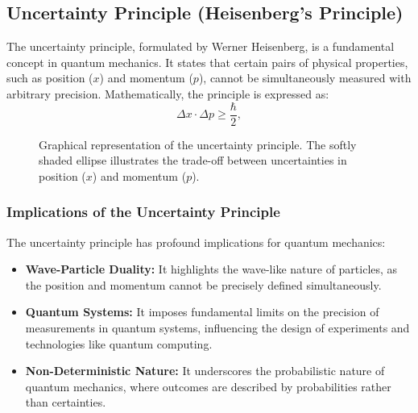 \documentclass[12pt,a4paper]{report}
\begin{document}
\subsection{Uncertainty Principle (Heisenberg's Principle)}
The uncertainty principle, formulated by Werner Heisenberg, is a fundamental concept in quantum mechanics. It states that certain pairs of physical properties, such as position (\(x\)) and momentum (\(p\)), cannot be simultaneously measured with arbitrary precision. Mathematically, the principle is expressed as:
\[
\Delta x \cdot \Delta p \geq \frac{\hbar}{2},
\]
\begin{figure}[H]
     \centering
        \caption[Uncertainty Principle]{Graphical representation of the uncertainty principle. The softly shaded ellipse illustrates the trade-off between uncertainties in position (\(x\)) and momentum (\(p\)).}
\end{figure}

\subsubsection{Implications of the Uncertainty Principle}
The uncertainty principle has profound implications for quantum mechanics:
\begin{itemize}
    \item \textbf{Wave-Particle Duality:} It highlights the wave-like nature of particles, as the position and momentum cannot be precisely defined simultaneously.
    \item \textbf{Quantum Systems:} It imposes fundamental limits on the precision of measurements in quantum systems, influencing the design of experiments and technologies like quantum computing.
    \item \textbf{Non-Deterministic Nature:} It underscores the probabilistic nature of quantum mechanics, where outcomes are described by probabilities rather than certainties.
\end{itemize}
\end{document}
